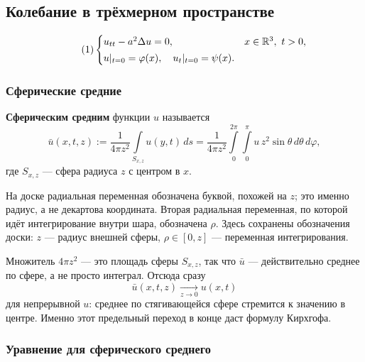 \subsection{Колебание в трёхмерном пространстве}

\begin{equation}\tag{1}\label{eq:wave3-free}
  \begin{cases}
    u_{tt} - a^2 \Delta u = 0, & x \in \mathbb{R}^3,\ t > 0, \\[2pt]
    u|_{t=0} = \varphi(x), \quad u_t|_{t=0} = \psi(x) .
  \end{cases}
\end{equation}

\subsubsection*{Сферические средние}

\begin{definition}
\textbf{Сферическим средним} функции $u$ называется
\[
  \bar u(x,t,z) := \frac{1}{4\pi z^2} \int\limits_{S_{x,z}} u(y,t)\, ds
  = \frac{1}{4\pi z^2} \int\limits_0^{2\pi} \int\limits_0^{\pi}
    u\, z^2 \sin\theta \, d\theta\, d\varphi ,
\]
где $S_{x,z}$ — сфера радиуса $z$ с центром в $x$.
\end{definition}

\begin{warn}
На доске радиальная переменная обозначена буквой, похожей на $z$; это именно
радиус, а не декартова координата. Вторая радиальная переменная, по которой идёт
интегрирование внутри шара, обозначена $\rho$. Здесь сохранены обозначения доски:
$z$ — радиус внешней сферы, $\rho \in [0,z]$ — переменная интегрирования.
\end{warn}


\begin{idea}
Множитель $4\pi z^2$ — это площадь сферы $S_{x,z}$, так что $\bar u$ —
действительно среднее по сфере, а не просто интеграл. Отсюда сразу
\[
  \bar u(x,t,z) \xrightarrow[z \to 0]{} u(x,t)
\]
для непрерывной $u$: среднее по стягивающейся сфере стремится к значению в
центре. Именно этот предельный переход в конце даст формулу Кирхгофа.
\end{idea}

\subsubsection*{Уравнение для сферического среднего}

